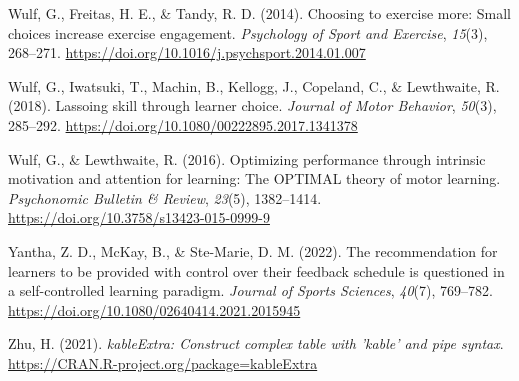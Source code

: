 \documentclass[
  man, donotrepeattitle,mask,floatsintext]{apa7}
\newlength{\cslhangindent}
\newlength{\cslentryspacingunit} %
\newenvironment{CSLReferences}[2] %
 {%
  \setlength{\parindent}{0pt}
  \ifodd #1
  \let\oldpar\par
  \def\par{\hangindent=\cslhangindent\oldpar}
  \fi
  \setlength{\parskip}{#2\cslentryspacingunit}
 }%
 {}
\begin{document}
\begin{CSLReferences}{1}{0}
\leavevmode{}%
Wulf, G., Freitas, H. E., \& Tandy, R. D. (2014). Choosing to exercise more: {Small} choices increase exercise engagement. \emph{Psychology of Sport and Exercise}, \emph{15}(3), 268--271. \url{https://doi.org/10.1016/j.psychsport.2014.01.007}

\leavevmode{}%
Wulf, G., Iwatsuki, T., Machin, B., Kellogg, J., Copeland, C., \& Lewthwaite, R. (2018). Lassoing skill through learner choice. \emph{Journal of Motor Behavior}, \emph{50}(3), 285--292. \url{https://doi.org/10.1080/00222895.2017.1341378}

\leavevmode{}%
Wulf, G., \& Lewthwaite, R. (2016). Optimizing performance through intrinsic motivation and attention for learning: {The OPTIMAL} theory of motor learning. \emph{Psychonomic Bulletin \& Review}, \emph{23}(5), 1382--1414. \url{https://doi.org/10.3758/s13423-015-0999-9}

\leavevmode{}%
Yantha, Z. D., McKay, B., \& Ste-Marie, D. M. (2022). The recommendation for learners to be provided with control over their feedback schedule is questioned in a self-controlled learning paradigm. \emph{Journal of Sports Sciences}, \emph{40}(7), 769--782. \url{https://doi.org/10.1080/02640414.2021.2015945}

\leavevmode{}%
Zhu, H. (2021). \emph{kableExtra: Construct complex table with 'kable' and pipe syntax}. \url{https://CRAN.R-project.org/package=kableExtra}

\end{CSLReferences}
\end{document}
